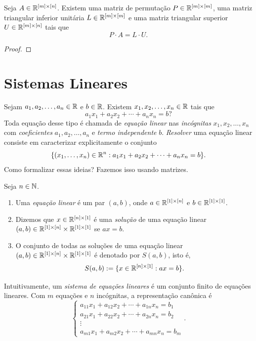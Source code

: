 \begin{theorem}
    Seja $A \in \mathbb{R}^{[m] \times [n]}$. Existem uma matriz de permutação $P \in \mathbb{R}^{[m] \times [m]}$, uma matriz triangular inferior unitária $L \in \mathbb{R}^{[m] \times [m]}$ e uma matriz triangular superior $U \in \mathbb{R}^{[m] \times [n]}$ tais que
        \[
            P \cdot A = L \cdot U.
        \]
\end{theorem}

\begin{proof}
    \blackproof
\end{proof}

\section{Sistemas Lineares}

Sejam $a_1, a_2, \ldots , a_n \in \mathbb{R}$ e $b \in \mathbb{R}$. Existem $x_1, x_2, \ldots, x_n \in \mathbb{R}$ tais que
    \[
        a_1 x_1 + a_2 x_2 + \cdots + a_n x_n = b \text{?}
    \]
Toda equação desse tipo é chamada de \emph{equação linear} nas \emph{incógnitas} $x_1, x_2, \ldots, x_n$ com \emph{coeficientes} $a_1, a_2, \ldots, a_n$ e \emph{termo independente} $b$. \emph{Resolver} uma equação linear consiste em caracterizar explicitamente o conjunto
    \[
        \{ (x_1, \ldots, x_n) \in \mathbb{R}^n : a_1 x_1 + a_2 x_2 + \cdots + a_n x_n = b \}.
    \]
Como formalizar essas ideias? Fazemos isso usando matrizes.


\begin{definition}
    Seja $n \in \mathbb{N}$.
        \begin{enumerate}[leftmargin=*, align=left, label=\textbf{(\alph*)}]
            \item Uma \emph{equação linear} é um par $(a,b)$, onde $a \in \mathbb{R}^{[1] \times [n]}$ e $b \in \mathbb{R}^{[1] \times [1]}$.
            \item Dizemos que $x \in \mathbb{R}^{[n] \times [1]}$ é uma \emph{solução} de uma equação linear $(a,b) \in \mathbb{R}^{[1] \times [n]} \times \mathbb{R}^{[1] \times [1]}$ se $ax=b$.
            \item O conjunto de todas as soluções de uma equação linear $(a,b) \in \mathbb{R}^{[1] \times [n]} \times \mathbb{R}^{[1] \times [1]}$ é denotado por $S(a,b)$, isto é,
                \[
                    S(a,b) := \{x \in \mathbb{R}^{[n] \times [1]} : ax=b\}.
                \]
        \end{enumerate}
\end{definition}

Intuitivamente, um \emph{sistema de equações lineares} é um conjunto finito de equações lineares. Com $m$ equações e $n$ incógnitas, a representação canônica é
    \[
        \left\{
            \begin{matrix}
                a_{11} x_1 + a_{12} x_2 + \cdots + a_{1n} x_n = b_1 \\
                a_{21} x_1 + a_{22} x_2 + \cdots + a_{2n} x_n = b_2 \\
                \vdots \\
                a_{m1} x_1 + a_{m2} x_2 + \cdots + a_{mn} x_n = b_m
            \end{matrix}
        \right. .
    \]

